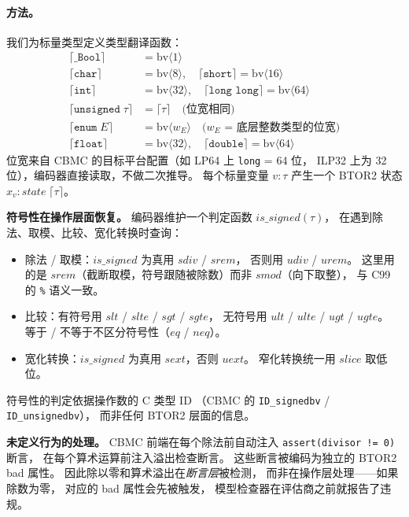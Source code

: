 \documentclass[11pt,a4paper]{article}
\begin{document}
\paragraph{方法。}
我们为标量类型定义类型翻译函数：
\begin{align*}
\lceil \texttt{\_Bool} \rceil &= \mathrm{bv}\langle 1 \rangle \\
\lceil \texttt{char} \rceil &= \mathrm{bv}\langle 8 \rangle, \quad
\lceil \texttt{short} \rceil = \mathrm{bv}\langle 16 \rangle \\
\lceil \texttt{int} \rceil &= \mathrm{bv}\langle 32 \rangle, \quad
\lceil \texttt{long long} \rceil = \mathrm{bv}\langle 64 \rangle \\
\lceil \texttt{unsigned}\;\tau \rceil &= \lceil \tau \rceil
  \quad \textit{(位宽相同)} \\
\lceil \texttt{enum}\;E \rceil &= \mathrm{bv}\langle w_E \rangle
  \quad \textit{($w_E$ = 底层整数类型的位宽)} \\
\lceil \texttt{float} \rceil &= \mathrm{bv}\langle 32 \rangle, \quad
\lceil \texttt{double} \rceil = \mathrm{bv}\langle 64 \rangle
\end{align*}
位宽来自 CBMC 的目标平台配置（如 LP64 上 \texttt{long} = 64 位，
ILP32 上为 32 位），编码器直接读取，不做二次推导。
每个标量变量 $v : \tau$ 产生一个 BTOR2 状态
$x_v : \mathit{state}\;\lceil \tau \rceil$。

\textbf{符号性在操作层面恢复。}
编码器维护一个判定函数 $\mathit{is\_signed}(\tau)$，
在遇到除法、取模、比较、宽化转换时查询：
\begin{itemize}
\item 除法 / 取模：$\mathit{is\_signed}$ 为真用 $\mathit{sdiv}$ / $\mathit{srem}$，
  否则用 $\mathit{udiv}$ / $\mathit{urem}$。
  这里用的是 $\mathit{srem}$（截断取模，符号跟随被除数）而非 $\mathit{smod}$（向下取整），
  与 C99 的 \texttt{\%} 语义一致。
\item 比较：有符号用 $\mathit{slt}$ / $\mathit{slte}$ / $\mathit{sgt}$ / $\mathit{sgte}$，
  无符号用 $\mathit{ult}$ / $\mathit{ulte}$ / $\mathit{ugt}$ / $\mathit{ugte}$。
  等于 / 不等于不区分符号性（$\mathit{eq}$ / $\mathit{neq}$）。
\item 宽化转换：$\mathit{is\_signed}$ 为真用 $\mathit{sext}$，否则 $\mathit{uext}$。
  窄化转换统一用 $\mathit{slice}$ 取低位。
\end{itemize}
符号性的判定依据操作数的 C 类型 ID
（CBMC 的 \texttt{ID\_signedbv} / \texttt{ID\_unsignedbv}），
而非任何 BTOR2 层面的信息。

\textbf{未定义行为的处理。}
CBMC 前端在每个除法前自动注入 \texttt{assert(divisor != 0)} 断言，
在每个算术运算前注入溢出检查断言。
这些断言被编码为独立的 BTOR2 bad 属性。
因此除以零和算术溢出在\emph{断言层}被检测，
而非在操作层处理——如果除数为零，
对应的 bad 属性会先被触发，
模型检查器在评估商之前就报告了违规。
\end{document}
